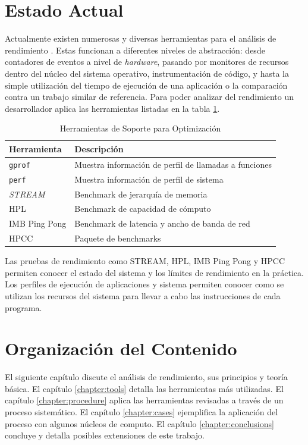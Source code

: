 \documentclass[a4paper]{report}
\begin{document}
\section{Estado Actual}

Actualmente existen numerosas y diversas herramientas para el análisis de rendimiento \cite{gregg}.
Estas funcionan a diferentes niveles de abstracción: desde contadores de eventos
a nivel de {\it hardware}, pasando por monitores de recursos dentro del núcleo del sistema operativo, instrumentación de código, y hasta la simple utilización del tiempo de ejecución de una aplicación o la comparación contra un trabajo similar de referencia.
Para poder analizar del rendimiento un desarrollador aplica las herramientas listadas en la tabla \ref{table:tools}.

\begin{table}[H]
    \caption{Herramientas de Soporte para Optimización}
    \centering
    \begin{tabular}{|l|l|}\hline
      {\bf Herramienta} & {\bf Descripción} \\ \hline
      {\tt gprof} & Muestra información de perfil de llamadas a funciones \\ \hline
      {\tt perf} & Muestra información de perfil de sistema \\ \hline
      {\it STREAM} & Benchmark de jerarquía de memoria \\ \hline
      HPL & Benchmark de capacidad de cómputo \\ \hline
      IMB Ping Pong & Benchmark de latencia y ancho de banda de red \\ \hline
      HPCC & Paquete de benchmarks \\ \hline
    \end{tabular}
    \label{table:tools}
\end{table}

Las pruebas de rendimiento como STREAM, HPL, IMB Ping Pong y HPCC permiten conocer el estado del sistema y los límites de rendimiento en la práctica.
Los perfiles de ejecución de aplicaciones y sistema permiten conocer como se utilizan los recursos del sistema para llevar a cabo las instrucciones de cada programa.

\section{Organización del Contenido}

El siguiente capítulo discute el análisis de rendimiento, sus
principios y teoría básica. El capítulo \ref{chapter:tools} detalla las herramientas más
utilizadas. El capítulo \ref{chapter:procedure} aplica las herramientas revisadas a través de un proceso sistemático. El capítulo \ref{chapter:cases} ejemplifica la aplicación del proceso con algunos núcleos de computo. El capítulo \ref{chapter:conclusions} concluye y detalla posibles extensiones de este trabajo.
\end{document}
